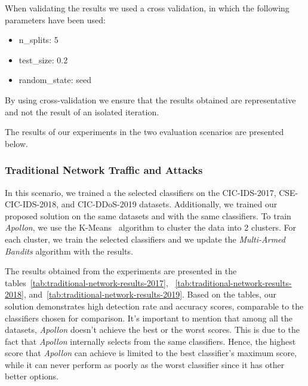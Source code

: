 When validating the results we used a cross validation, in which the following parameters have been used:
\begin{itemize}
    \item n_splits: 5
    \item test_size: 0.2
    \item random_state: seed
\end{itemize}
By using cross-validation we ensure that the results obtained are representative and not the result of an isolated iteration. 

The results of our experiments in the two evaluation scenarios are presented below.

\subsubsection{Traditional Network Traffic and Attacks}
In this scenario, we trained a the selected classifiers on the CIC-IDS-2017, CSE-CIC-IDS-2018, and CIC-DDoS-2019 datasets.
Additionally, we trained our proposed solution on the same datasets and with the same classifiers.
To train \textit{Apollon}, we use the K-Means~\cite{likas2003global} algorithm to cluster the data into 2 clusters.
For each cluster, we train the selected classifiers and we update the \textit{Multi-Armed Bandits} algorithm with the results.

The results obtained from the experiments are presented in the tables~\ref{tab:traditional-network-results-2017},
~\ref{tab:traditional-network-results-2018}, and~\ref{tab:traditional-network-results-2019}.
Based on the tables, our solution demonstrates high detection rate and accuracy scores, comparable to the classifiers
chosen for comparison.
It's important to mention that among all the datasets, \textit{Apollon} doesn't achieve the best or the worst scores.
This is due to the fact that \textit{Apollon} internally selects from the same classifiers.
Hence, the highest score that \textit{Apollon} can achieve is limited to the best classifier's maximum score, while it can never
perform as poorly as the worst classifier since it has other better options.



